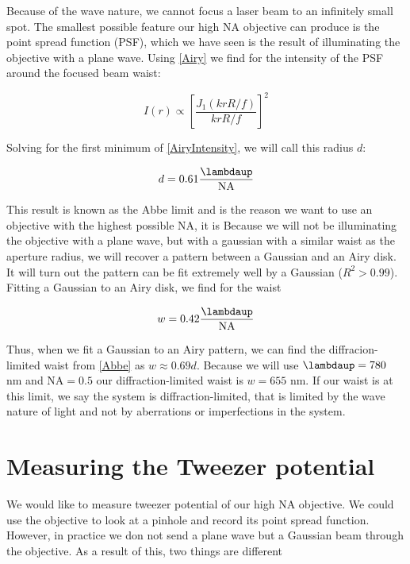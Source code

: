Because of the wave nature, we cannot focus a laser beam to an infinitely small spot. The smallest possible feature our high NA objective can produce is the point spread function (PSF), which we have seen is the result of illuminating the objective with a plane wave. Using \cref{Airy} we find for the intensity of the PSF around the focused beam waist:

\begin{equation}\label{AiryIntensity}
    I(r) \propto \left[\frac{J_1(krR/f)}{krR/f} \right]^2
\end{equation}

Solving for the first minimum of \cref{AiryIntensity}, we will call this radius $d$:

\begin{equation}\label{Abbe}
    d = 0.61 \frac{\lambdaup}{\text{NA}}
\end{equation}

This result is known as the Abbe limit \cite{Hecht2002} and is the reason we want to use an objective with the highest possible NA, it is Because we will not be illuminating the objective with a plane wave, but with a gaussian with a similar waist as the aperture radius, we will recover a pattern between a Gaussian and an Airy disk. It will turn out the pattern can be fit extremely well by a Gaussian ($R^2 > 0.99$). Fitting a Gaussian to an Airy disk, we find for the waist

\begin{equation}\label{GaussianAiryFit}
    w = 0.42 \frac{\lambdaup}{\text{NA}}
\end{equation}
 
Thus, when we fit a Gaussian to an Airy pattern, we can find the diffracion-limited waist from \cref{Abbe} as $w \approx 0.69 d$. Because we will use $\lambdaup = 780$ nm and $\text{NA}=0.5$ our diffraction-limited waist is $w = 655$ nm. If our waist is at this limit, we say the system is diffraction-limited, that is limited by the wave nature of light and not by aberrations or imperfections in the system. 


\section{Measuring the Tweezer potential}

We would like to measure tweezer potential of our high NA objective. We could use the objective to look at a pinhole and record its point spread function. However, in practice we don not send a plane wave but a Gaussian beam through the objective. As a result of this, two things are different \cite{Sortais2007}

